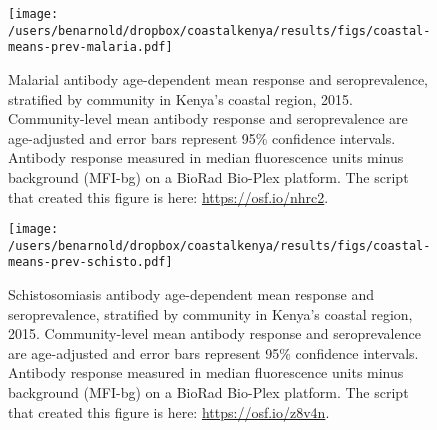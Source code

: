 \documentclass[11pt]{article}
\begin{document}
\begin{landscape}
\begin{figure}[htbp]
\begin{center}
\texttt{[image: /users/benarnold/dropbox/coastalkenya/results/figs/coastal-means-prev-malaria.pdf]} 
\begin{minipage}{1.2\textwidth}
\caption{Malarial antibody age-dependent mean response and seroprevalence, stratified by community in Kenya's coastal region, 2015. Community-level mean antibody response and seroprevalence are age-adjusted and error bars represent 95\% confidence intervals. Antibody response measured in median fluorescence units minus background (MFI-bg) on a BioRad Bio-Plex platform. The script that created this figure is here: \url{https://osf.io/nhrc2}. \label{fig:malbigpfig}}

\end{minipage}
\end{center}
\end{figure}
\end{landscape}


\begin{landscape}
\begin{figure}[htbp]
\begin{center}
\texttt{[image: /users/benarnold/dropbox/coastalkenya/results/figs/coastal-means-prev-schisto.pdf]} 
\begin{minipage}{1.2\textwidth}
\caption{Schistosomiasis antibody age-dependent mean response and seroprevalence, stratified by community in Kenya's coastal region, 2015. Community-level mean antibody response and seroprevalence are age-adjusted and error bars represent 95\% confidence intervals. Antibody response measured in median fluorescence units minus background (MFI-bg) on a BioRad Bio-Plex platform. The script that created this figure is here: \url{https://osf.io/z8v4n}. \label{fig:schbigfig}}
\end{minipage}
\end{center}
\end{figure}
\end{landscape}
\end{document}
